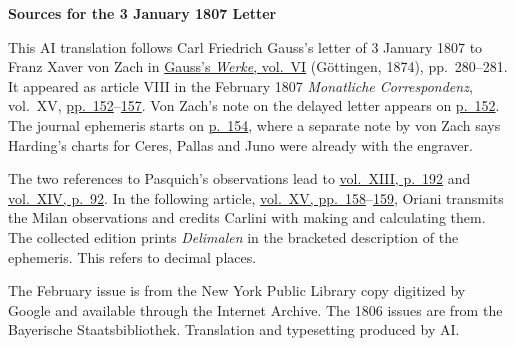 \clearpage\thispagestyle{empty}
\begin{center}\textbf{Sources for the 3 January 1807 Letter}\end{center}
\noindent This AI translation follows Carl Friedrich Gauss’s letter of 3 January 1807 to Franz Xaver von Zach in \href{https://gdz.sub.uni-goettingen.de/id/PPN236007467}{Gauss’s \textit{Werke}, vol.~VI} (Göttingen, 1874), pp.~280--281. It appeared as article VIII in the February 1807 \textit{Monatliche Correspondenz}, vol.~XV, \href{https://archive.org/details/bub_gb_sKAAAAAAMAAJ/page/n157/mode/1up}{pp.~152}--\href{https://archive.org/details/bub_gb_sKAAAAAAMAAJ/page/n162/mode/1up}{157}. Von Zach’s note on the delayed letter appears on \href{https://archive.org/details/bub_gb_sKAAAAAAMAAJ/page/n157/mode/1up}{p.~152}. The journal ephemeris starts on \href{https://archive.org/details/bub_gb_sKAAAAAAMAAJ/page/n159/mode/1up}{p.~154}, where a separate note by von Zach says Harding’s charts for Ceres, Pallas and Juno were already with the engraver.
\par\medskip
The two references to Pasquich’s observations lead to \href{https://www.digitale-sammlungen.de/en/view/bsb10538605?page=200}{vol.~XIII, p.~192} and \href{https://www.digitale-sammlungen.de/en/view/bsb10538606?page=102}{vol.~XIV, p.~92}. In the following article, \href{https://archive.org/details/bub_gb_sKAAAAAAMAAJ/page/n163/mode/1up}{vol.~XV, pp.~158}--\href{https://archive.org/details/bub_gb_sKAAAAAAMAAJ/page/n164/mode/1up}{159}, Oriani transmits the Milan observations and credits Carlini with making and calculating them. The collected edition prints \emph{Delimalen} in the bracketed description of the ephemeris. This refers to decimal places.
\par\medskip
The February issue is from the New York Public Library copy digitized by Google and available through the Internet Archive. The 1806 issues are from the Bayerische Staatsbibliothek. Translation and typesetting produced by AI.
\clearpage
